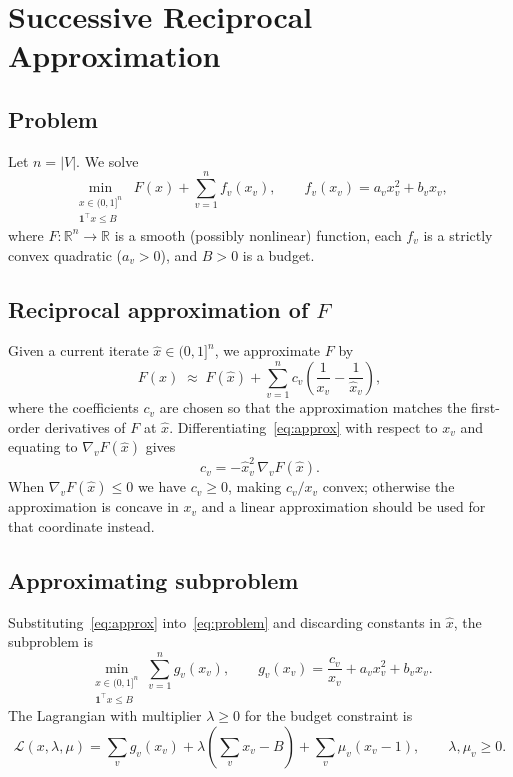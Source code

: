 \documentclass{article}
\newcommand{\R}{\mathbb{R}}
\begin{document}
\section*{Successive Reciprocal Approximation}

\subsection*{Problem}

Let $n = |V|$. We solve
\begin{equation}
  \min_{\substack{x \in (0,1]^n \\ \mathbf{1}^\top x \leq B}}
  \;F(x) + \sum_{v=1}^n f_v(x_v),
  \qquad f_v(x_v) = a_v x_v^2 + b_v x_v,
  \label{eq:problem}
\end{equation}
where $F : \R^n \to \R$ is a smooth (possibly nonlinear) function,
each $f_v$ is a strictly convex quadratic ($a_v > 0$), and $B > 0$ is a
budget.

\subsection*{Reciprocal approximation of $F$}

Given a current iterate $\hat x \in (0,1]^n$, we approximate $F$ by
\begin{equation}
  F(x) \;\approx\; F(\hat x)
    + \sum_{v=1}^n c_v \!\left(\frac{1}{x_v} - \frac{1}{\hat x_v}\right),
  \label{eq:approx}
\end{equation}
where the coefficients $c_v$ are chosen so that the approximation matches the
first-order derivatives of $F$ at $\hat x$.  Differentiating~\eqref{eq:approx}
with respect to $x_v$ and equating to $\nabla_v F(\hat x)$ gives
\begin{equation}
  c_v = -\hat x_v^2\,\nabla_v F(\hat x).
  \label{eq:cv}
\end{equation}
When $\nabla_v F(\hat x) \leq 0$ we have $c_v \geq 0$, making $c_v/x_v$
convex; otherwise the approximation is concave in $x_v$ and a linear
approximation should be used for that coordinate instead.

\subsection*{Approximating subproblem}

Substituting~\eqref{eq:approx} into~\eqref{eq:problem} and discarding
constants in $\hat x$, the subproblem is
\begin{equation}
  \min_{\substack{x \in (0,1]^n \\ \mathbf{1}^\top x \leq B}}
  \sum_{v=1}^n g_v(x_v),
  \qquad
  g_v(x_v) = \frac{c_v}{x_v} + a_v x_v^2 + b_v x_v.
  \label{eq:sub}
\end{equation}
The Lagrangian with multiplier $\lambda \geq 0$ for the budget constraint is
\[
  \mathcal{L}(x,\lambda,\mu)
  = \sum_v g_v(x_v)
    + \lambda\!\left(\sum_v x_v - B\right)
    + \sum_v \mu_v(x_v - 1),
  \qquad \lambda,\mu_v \geq 0.
\]
\end{document}
